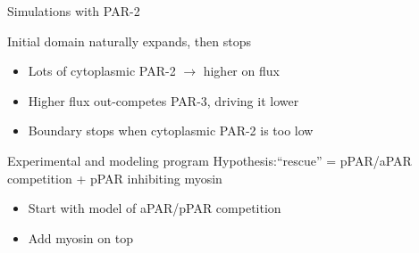 \documentclass{beamer}
\newcommand{\6}[1]{#1_{\text{6}}}
\newcommand{\3}[1]{#1_{\text{3}}}
\newcommand{\lightgray}[1]{\color{lightgray}#1\normalcolor}
\begin{document}
\begin{frame}{Simulations with PAR-2}
\begin{center}
\end{center}
Initial domain naturally expands, then stops 
\begin{itemize}
\item Lots of cytoplasmic PAR-2 $\rightarrow$ higher on flux
\item Higher flux out-competes PAR-3, driving it lower
\item Boundary stops when cytoplasmic PAR-2 is too low
\end{itemize}
\end{frame}

\begin{frame}{Experimental and modeling program}
Hypothesis:``rescue'' = pPAR/aPAR competition + pPAR inhibiting myosin 
\begin{itemize}
\item \lightgray{Start with model of aPAR/pPAR competition}
\item Add myosin on top
\end{itemize}
\end{frame}
\end{document}
